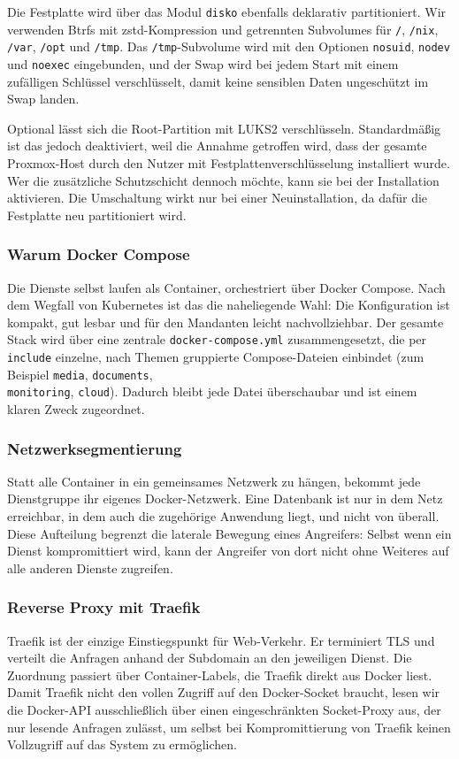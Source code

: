 Die Festplatte wird über das Modul \texttt{disko} ebenfalls deklarativ
partitioniert. Wir verwenden Btrfs mit zstd-Kompression und getrennten
Subvolumes für \texttt{/}, \texttt{/nix}, \texttt{/var}, \texttt{/opt} und
\texttt{/tmp}. Das \texttt{/tmp}-Subvolume wird mit den Optionen
\texttt{nosuid}, \texttt{nodev} und \texttt{noexec} eingebunden, und der
Swap wird bei jedem Start mit einem zufälligen Schlüssel verschlüsselt, damit
keine sensiblen Daten ungeschützt im Swap landen.

Optional lässt sich die Root-Partition mit \ac{LUKS}2 verschlüsseln. \label{sec:LUKS2_apphost}
Standardmäßig ist das jedoch deaktiviert, weil die Annahme getroffen wird,
dass der gesamte Proxmox-Host durch den Nutzer mit Festplattenverschlüsselung installiert wurde.
Wer die zusätzliche Schutzschicht dennoch möchte, kann sie bei der Installation aktivieren.
Die Umschaltung wirkt nur bei einer Neuinstallation, da dafür die Festplatte neu partitioniert
wird.

\subsubsection{Warum Docker Compose}
Die Dienste selbst laufen als Container, orchestriert über Docker Compose. Nach
dem Wegfall von Kubernetes ist das die naheliegende Wahl: Die Konfiguration ist
kompakt, gut lesbar und für den Mandanten leicht nachvollziehbar. Der gesamte
Stack wird über eine zentrale \texttt{docker-compose.yml} zusammengesetzt, die
per \texttt{include} einzelne, nach Themen gruppierte Compose-Dateien einbindet
(zum Beispiel \texttt{media}, \texttt{documents},\\ \texttt{monitoring},
\texttt{cloud}). Dadurch bleibt jede Datei überschaubar und ist einem klaren
Zweck zugeordnet.

\subsubsection{Netzwerksegmentierung}
\label{sec:apphost-netze}
Statt alle Container in ein gemeinsames Netzwerk zu hängen, bekommt jede
Dienstgruppe ihr eigenes Docker-Netzwerk. Eine Datenbank ist nur in dem Netz
erreichbar, in dem auch die zugehörige Anwendung liegt, und nicht von überall.
Diese Aufteilung begrenzt die laterale Bewegung eines Angreifers: Selbst wenn
ein Dienst kompromittiert wird, kann der Angreifer von dort nicht ohne Weiteres
auf alle anderen Dienste zugreifen.


\subsubsection{Reverse Proxy mit Traefik}
Traefik ist der einzige Einstiegspunkt für Web-Verkehr. Er terminiert \ac{TLS} und
verteilt die Anfragen anhand der Subdomain an den jeweiligen Dienst. Die
Zuordnung passiert über Container-Labels, die Traefik direkt aus Docker liest.
Damit Traefik nicht den vollen Zugriff auf den Docker-Socket braucht, lesen wir
die Docker-\ac{API} ausschließlich über einen eingeschränkten Socket-Proxy aus,
der nur lesende Anfragen zulässt, um selbst bei Kompromittierung von Traefik keinen Vollzugriff auf das System zu ermöglichen.

